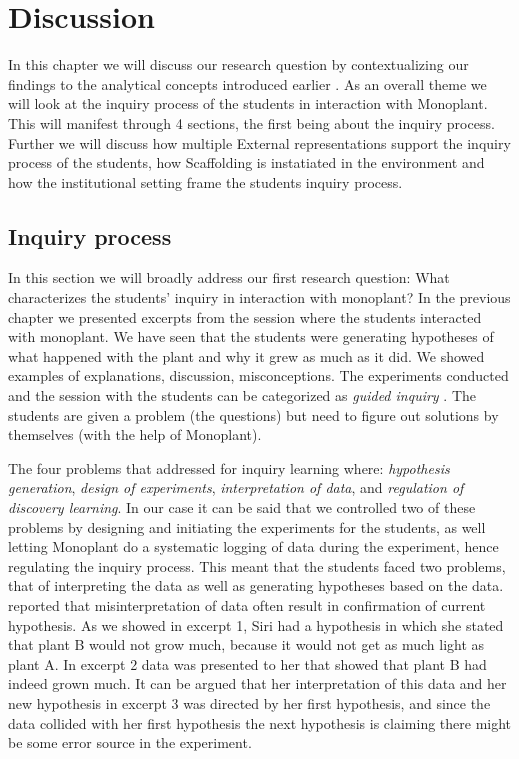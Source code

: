 \chapter{Discussion}
In this chapter we will discuss our research question by contextualizing our findings to the analytical concepts introduced earlier . As an overall theme we will look at the inquiry process of the students in interaction with Monoplant. This will manifest through 4 sections, the first being about the inquiry process. Further we will discuss how multiple External representations support the inquiry process of the students, how Scaffolding is instatiated in the environment and how the institutional setting frame the students inquiry process.

\section{Inquiry process}
In this section we will broadly address our first research question: What characterizes the students’ inquiry in interaction with monoplant? 
In the previous chapter we presented excerpts from the session where the students interacted with monoplant. We have seen that the students were generating hypotheses of what happened with the plant and why it grew as much as it did. We showed examples of explanations, discussion, misconceptions.
The experiments conducted and the session with the students can be categorized as \emph{guided inquiry} \citeauthor*{staver1987analysis} \citetext{\citeyear{staver1987analysis}, referenced in \citealp{prince2006inductive}}. The students are given a problem (the questions) but need to figure out solutions by themselves (with the help of Monoplant). 

The four problems that \citep{de1998scientific} addressed for inquiry learning where: \textit{hypothesis generation}, \textit{design of experiments}, \textit{interpretation of data}, and \textit{regulation of discovery learning}. In our case it can be said that we controlled two of these problems by designing and initiating the experiments for the students, as well letting Monoplant do a systematic logging of data during the experiment, hence regulating the inquiry process. This meant that the students faced two problems, that of interpreting the data as well as generating hypotheses based on the data. \citeauthor*{klahr1993heuristics} \citetext{\citeyear{klahr1993heuristics}, referenced in \citealp{de1998scientific}} reported that misinterpretation of data often result in confirmation of current hypothesis. As we showed in excerpt 1, Siri had a hypothesis in which she stated that plant B would not grow much, because it would not get as much light as plant A. In excerpt 2 data was presented to her that showed that plant B had indeed grown much. It can be argued that her interpretation of this data and her new hypothesis in excerpt 3 was directed by her first hypothesis, and since the data collided with her first hypothesis the next hypothesis is claiming there might be some error source in the experiment. 

